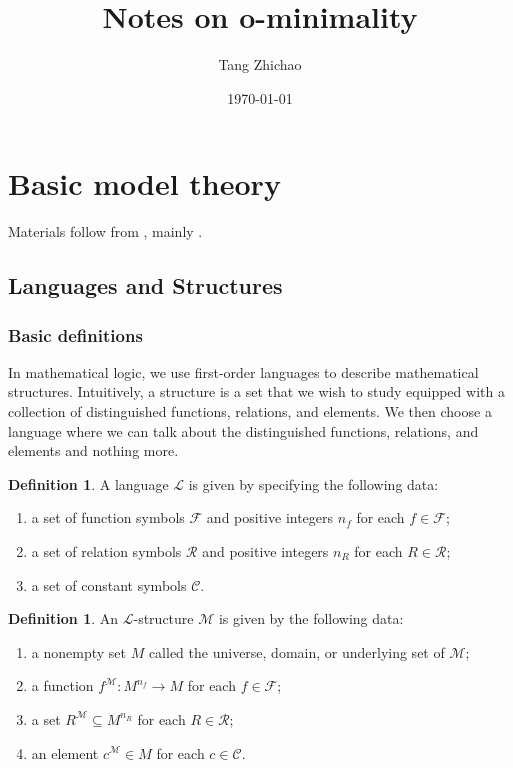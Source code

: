 \documentclass{amsart}
\title{Notes on o-minimality}
\author{Tang Zhichao}
\date{\today}
\theoremstyle{definition}
\newtheorem{definition}[theorem]{Definition}
\numberwithin{equation}{section}
\begin{document}
\maketitle

\section{Basic model theory}
Materials follow from \cite{zbMATH01821671,zbMATH01160037},
mainly \cite{zbMATH01821671}.
\subsection{Languages and Structures}
\subsubsection{Basic definitions}
In mathematical logic, 
we use first-order languages to describe mathematical structures. 
Intuitively, a structure is a set that we wish to study equipped with a collection of distinguished functions, relations, and elements. 
We then choose a language where we can talk about the distinguished functions, relations, and elements and nothing more.

\begin{definition}
A language $\mathcal{L}$ is given by specifying the following data:
\begin{enumerate}[label = {(\roman*)}]
    \item a set of function symbols $\mathcal{F}$ and positive integers $n_f$ for each $f \in \mathcal{F}$;
    \item a set of relation symbols $\mathcal{R}$ and positive integers $n_R$ for each $R \in \mathcal{R}$;
    \item a set of constant symbols $\mathcal{C}$.
\end{enumerate}
\end{definition}

\begin{definition}
An $\mathcal{L}$-structure $\mathcal{M}$ is given by the following data:
    \begin{enumerate}[label = {(\roman*)}]
    \item a nonempty set $M$ called the universe, domain, or underlying set of $\mathcal{M}$;
    \item a function $f^{\mathcal{M}} : M^{n_f} \to M$ for each $f \in \mathcal{F}$;
    \item a set $R^{\mathcal{M}} \subseteq M^{n_R}$ for each $R \in \mathcal{R}$;
    \item an element $c^{\mathcal{M}} \in M$ for each $c \in \mathcal{C}$.
    \end{enumerate}
\end{definition}
\end{document}
